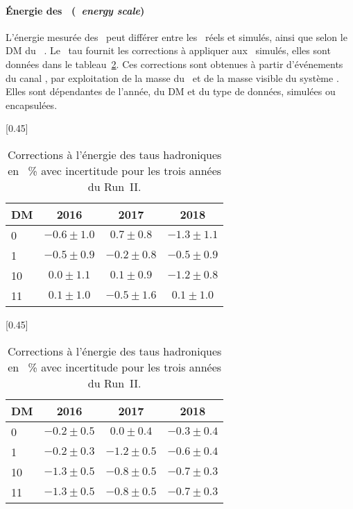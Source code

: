 \paragraph{Énergie des \tauh\ (\emph{\tauh\ energy scale})}
L'énergie mesurée des \tauh\ peut différer entre les \tauh\ réels et simulés, ainsi que selon le DM du \tauh~\cite{TauPOG}.
Le \POG\ tau fournit les corrections à appliquer aux \tauh\ simulés, elles sont données dans le tableau~\ref{tab-chapter-CMS-section-taus-corrections-tauES}.
Ces corrections sont obtenues à partir d'événements du canal \mu\tauh, par exploitation de la masse du \tauh\ et de la masse visible du système \mu\tauh.
Elles sont dépendantes de l'année, du DM et du type de données, simulées ou encapsulées.
\begin{table}[h]
\centering
{}[0.45\textwidth]
{\begin{tabular}{lccc}
\toprule
DM & 2016 & 2017 & 2018\\
\midrule
0 & $\num{-0.6}\pm\num{1.0}$ & $\num{0.7}\pm\num{0.8}$ & $\num{-1.3}\pm\num{1.1}$ \\
1 & $\num{-0.5}\pm\num{0.9}$ & $\num{-0.2}\pm\num{0.8}$ & $\num{-0.5}\pm\num{0.9}$ \\
10 & $\num{0.0}\pm\num{1.1}$ & $\num{0.1}\pm\num{0.9}$ & $\num{-1.2}\pm\num{0.8}$ \\
11 & $\num{0.1}\pm\num{1.0}$ & $\num{-0.5}\pm\num{1.6}$ & $\num{0.1}\pm\num{1.0}$ \\
\bottomrule
\end{tabular}}
\qquad
{}[0.45\textwidth]
{\begin{tabular}{lccc}
\toprule
DM & 2016 & 2017 & 2018\\
\midrule
0 & $\num{-0.2}\pm\num{0.5}$ & $\num{0.0}\pm\num{0.4}$ & $\num{-0.3}\pm\num{0.4}$ \\
1 & $\num{-0.2}\pm\num{0.3}$ & $\num{-1.2}\pm\num{0.5}$ & $\num{-0.6}\pm\num{0.4}$ \\
10 & $\num{-1.3}\pm\num{0.5}$ & $\num{-0.8}\pm\num{0.5}$ & $\num{-0.7}\pm\num{0.3}$ \\
11 & $\num{-1.3}\pm\num{0.5}$ & $\num{-0.8}\pm\num{0.5}$ & $\num{-0.7}\pm\num{0.3}$ \\
\bottomrule
\end{tabular}}
\caption[Corrections à l'énergie des taus hadroniques.]{Corrections à l'énergie des taus hadroniques en \SI{}{\%} avec incertitude pour les trois années du Run~II.}
\label{tab-chapter-CMS-section-taus-corrections-tauES}
\end{table}
